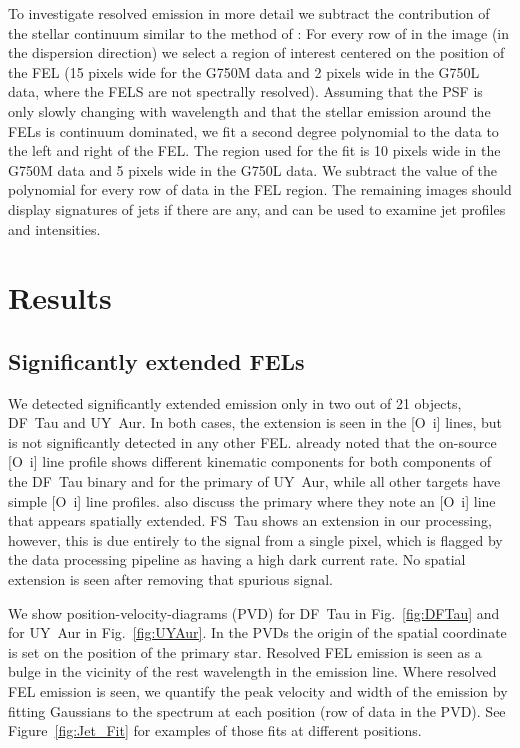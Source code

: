 \documentclass[twocolumn,trackchanges]{aastex63}
\begin{document}
To investigate resolved emission in more detail we subtract the contribution of
the stellar continuum similar to the method of \citet{2013A&A...550L...1S}: For
every row of in the image (in the dispersion direction) we select a region of
interest centered on the position of the FEL (15 pixels wide for the G750M data
and 2 pixels wide in the G750L data, where the FELS are not spectrally
resolved). Assuming that the PSF is only slowly changing with wavelength and
that the stellar emission around the FELs is continuum dominated, we fit a
second degree polynomial to the data to the left and right of the FEL. The
region used for the fit is 10 pixels wide in the G750M data and 5 pixels wide
in the G750L data. We subtract the value of the polynomial for every row of
data in the FEL region. The remaining images should display signatures of jets
if there are any, and can be used to examine jet profiles and intensities. 

\section{Results}
\label{sect:results}

\subsection{Significantly extended FELs}
We detected significantly extended emission only in two out of 21 objects,
DF~Tau and UY~Aur. In both cases, the extension is seen in the [O~{\sc i}]
lines, but is not significantly detected in any other
FEL. \citet{2003ApJ...583..334H} already noted that the on-source [O~{\sc i}]
line profile shows different kinematic components for both components of the
DF~Tau binary and for the primary of UY~Aur, while all other targets have
simple [O~{\sc i}] line profiles. \citet{2003ApJ...583..334H} also discuss the
 primary where they note an [O~{\sc i}] line that appears spatially
extended. FS~Tau shows an extension in our processing, however, this is due
entirely to the signal from a single pixel, which is flagged by the data
processing pipeline as having a high dark current rate. No spatial extension is seen after removing that spurious signal.

We show position-velocity-diagrams (PVD) for DF~Tau in Fig.~\ref{fig:DFTau}
and for UY~Aur in Fig.~\ref{fig:UYAur}. In the PVDs the
origin of the spatial coordinate is set on the position of the primary star. Resolved
FEL emission is seen as a bulge in the vicinity of the rest wavelength
in the emission line. Where resolved FEL emission is seen, we quantify the peak
velocity and width of the emission by fitting Gaussians to the spectrum at each
position (row of data in the PVD). See Figure~\ref{fig:Jet_Fit} for examples of
those fits at different positions.
\end{document}
